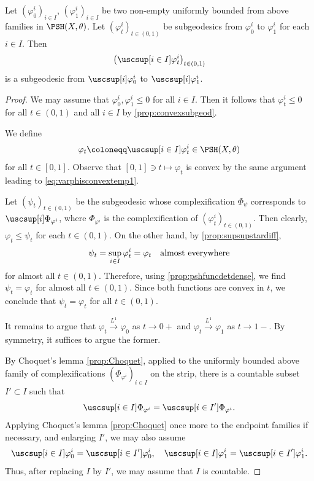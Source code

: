 \begin{proposition}\label{prop:maxsubgeod}
    Let $(\varphi^i_0)_{i\in I}$, $(\varphi^i_1)_{i\in I}$ be two non-empty uniformly bounded from above families in $\PSH(X,\theta)$. Let $(\varphi^i_t)_{t\in (0,1)}$ be subgeodesics from $\varphi_0^i$ to $\varphi_1^i$ for each $i\in I$. Then
    \[
    \left(\uscsup[i\in I]\varphi^i_t\right)_{t\in (0,1)}
    \]
    is a subgeodesic from $\uscsup[i] \varphi^i_0$ to $\uscsup[i] \varphi^i_1$.
\end{proposition}
\begin{proof}
    We may assume that $\varphi_0^i,\varphi_1^i\leq 0$ for all $i\in I$. Then it follows that $\varphi_t^i\leq 0$ for all $t\in (0,1)$ and all $i\in I$ by \cref{prop:convexsubgeod}.

    We define
    \[
    \varphi_t\coloneqq \uscsup[i\in I] \varphi^i_t\in \PSH(X,\theta)
    \]
    for all $t\in [0,1]$.
    Observe that $[0,1] \ni t\mapsto \varphi_t$ is convex by the same argument leading to \eqref{eq:varphisconvextemp1}.

    Let $(\psi_t)_{t\in (0,1)}$ be the subgeodesic whose complexification $\Phi_{\psi}$ corresponds to $\uscsup[i] \Phi_{\varphi^i}$, where $\Phi_{\varphi^i}$ is the complexification of $(\varphi^i_t)_{t\in (0,1)}$. Then clearly, $\varphi_t\leq \psi_t$ for each $t\in (0,1)$. On the other hand, by \cref{prop:supsupstardiff},
    \[
    \psi_t=\sup_{i\in I}\varphi^i_t=\varphi_t\quad \textup{almost everywhere}
    \]
    for almost all $t\in (0,1)$. Therefore, using \cref{prop:pshfuncdetdense}, we find $\psi_t=\varphi_t$ for almost all $t\in (0,1)$. Since both functions are convex in $t$, we conclude that $\psi_t=\varphi_t$ for all $t\in (0,1)$.

    It remains to argue that $\varphi_t\xrightarrow{L^1}\varphi_0$ as $t\to 0+$ and $\varphi_t\xrightarrow{L^1}\varphi_1$ as $t\to 1-$.
    By symmetry, it suffices to argue the former.

    By Choquet's lemma \cref{prop:Choquet}, applied to the uniformly bounded above family of complexifications $(\Phi_{\varphi^i})_{i\in I}$ on the strip, there is a countable subset $I'\subset I$ such that
    \[
    \uscsup[i\in I]\Phi_{\varphi^i}=\uscsup[i\in I']\Phi_{\varphi^i}.
    \]
    Applying Choquet's lemma \cref{prop:Choquet} once more to the endpoint families if necessary, and enlarging $I'$, we may also assume
    \[
    \uscsup[i\in I]\varphi_0^i=\uscsup[i\in I']\varphi_0^i,\quad \uscsup[i\in I]\varphi_1^i=\uscsup[i\in I']\varphi_1^i.
    \]
    Thus, after replacing $I$ by $I'$, we may assume that $I$ is countable.


\end{proof}
